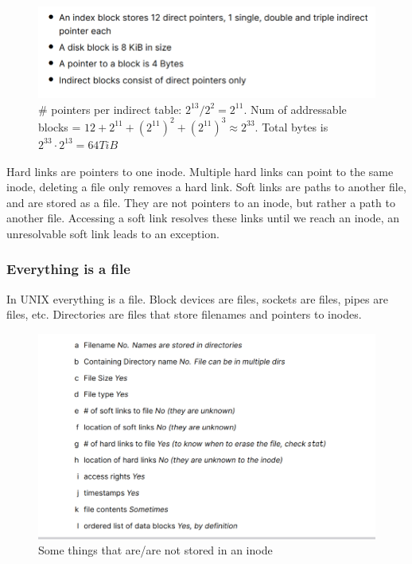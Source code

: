 \documentclass[../notes.tex]{subfiles}
\begin{document}
\begin{figure}[H]
    \centering
    \includegraphics[width=0.8\linewidth]{img/image_2023-03-16-17-49-55.png}
    \caption{\# pointers per indirect table: $2^{13}/2^2 = 2^{11}$. Num of addressable blocks = $ 12 + 2^{11} + (2^{11})^2 + (2^{11})^3 \approx 2^{33} $. Total bytes is $ 2^{33} \cdot  2^{13} = 64 TiB $}
\end{figure}


Hard links are pointers to one inode. Multiple hard links can point to the same inode, deleting a file only removes a hard link.
Soft links are paths to another file, and are stored as a file. They are not pointers to an inode, but rather a path to another file. Accessing a soft link resolves these links until we reach an inode, an unresolvable soft link leads to an exception.


\subsubsection{Everything is a file}

In UNIX everything is a file. Block devices are files, sockets are files, pipes are files, etc. Directories are files that store filenames and pointers to inodes. 


\begin{figure}[H]
    \centering
    \includegraphics[width=0.8\linewidth]{img/image_2023-03-16-17-59-51.png}
    \caption{Some things that are/are not stored in an inode}
\end{figure}
\end{document}
